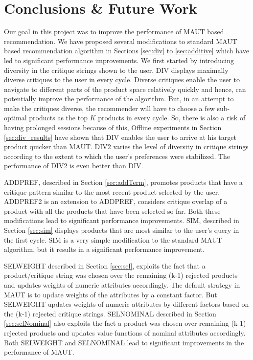 \chapter{Conclusions \& Future Work}
\label{chap:conclusions}
Our goal in this project was to improve the performance of MAUT based recommendation.
We have proposed several modifications to standard MAUT based recommendation algorithm in Sections \ref{sec:div} to \ref{sec:additive} which have led to significant performance improvements.
We first started by introducing diversity in the critique strings shown to the user.
DIV displays maximally diverse critiques to the user in every cycle. 
Diverse critiques enable the user to navigate to different parts of the product space relatively quickly and hence, can potentially improve the performance of the algorithm.
But, in an attempt to make the critiques diverse, the recommender will have to choose a few sub-optimal products as the top $K$ products in every cycle.
So, there is also a risk of having prolonged sessions because of this, 
Offline experiments in Section \ref{sec:div_results} have shown that DIV enables the user to arrive at his target product quicker than MAUT.
DIV2 varies the level of diversity in critique strings according to the extent to which the user's preferences were stabilized.
The performance of DIV2 is even better than DIV.

ADDPREF, described in Section \ref{sec:addTerm}, promotes products that have a critique pattern similar to the most recent product selected by the user.
ADDPREF2 is an extension to ADDPREF, considers critique overlap of a product with all the products that have been selected so far.
Both these modifications lead to significant performance improvements.
SIM, described in Section \ref{sec:sim} displays products that are most similar to the user's query in the first cycle.
SIM is a very simple modification to the standard MAUT algorithm, but it results in a significant performance improvement.

SELWEIGHT described in Section \ref{sec:sel}, exploits the fact that a product/critique string was chosen over the remaining (k-1) rejected products and updates weights of numeric attributes accordingly. 
The default strategy in MAUT is to update weights of the attributes by a constant factor.
But SELWEIGHT updates weights of numeric attributes by different factors based on the (k-1) rejected critique strings.
SELNOMINAL described in Section \ref{sec:selNominal} also exploits the fact a product was chosen over remaining (k-1) rejected products and updates value functions of nominal attributes accordingly.
Both SELWEIGHT and SELNOMINAL lead to significant improvements in the performance of MAUT.

